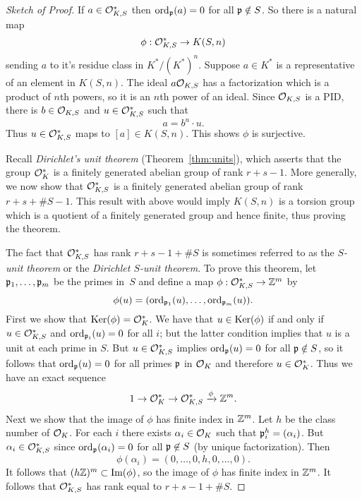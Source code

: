 \begin{proof}[Sketch of Proof]
	If $a \in \mathcal{O}_{K,S}^*$ then $\operatorname{ord}_{\mathfrak{p}}(a)=0$ for all $\mathfrak{p}\notin S$.
	So there is a natural map
	$$
		\phi: \mathcal{O}_{K,S}^* \to K(S,n)
	$$
	sending $a$ to it's residue class in $K^*/(K^*)^n$.
	Suppose $a\in K^*$ is a representative of an element in $K(S,n)$.
	The ideal $a \mathcal{O}_{K,S}$ has a factorization which is a product of $n$th
	powers, so it is an $n$th power of an ideal. Since $\mathcal{O}_{K,S}$ is a PID,
	there is $b\in \mathcal{O}_{K,S}$ and $u\in \mathcal{O}_{K,S}^*$ such that
	$$
		a = b^n \cdot u.
	$$
	Thus $u\in \mathcal{O}_{K,S}^*$ maps to $[a] \in K(S,n)$. This shows $\phi$
	is surjective.
	
	Recall {\em Dirichlet's unit theorem} (Theorem~\ref{thm:units}),
	which asserts that the group $\mathcal{O}_K^*$ is a finitely generated
	abelian group of rank $r+s-1$.  More generally, we
	now show that $\mathcal{O}_{K,S}^*$ is a finitely generated abelian group of
	rank $r+s+\#S -1$.
	This result with above would imply $K(S,n)$ is a torsion group
	which is a quotient of a finitely generated group and hence finite,
	thus proving the theorem.
	
	The fact that $\mathcal{O}_{K,S}^*$ has rank $r+s-1 + \#S$ is sometimes
	referred to as the \emph{$S$-unit theorem} or the
	\emph{Dirichlet $S$-unit theorem}. To prove this theorem,
	let $\mathfrak{p}_1,\ldots, \mathfrak{p}_m$ be the primes in~$S$
	and define a map $\phi: \mathcal{O}_{K,S}^* \to \mathbb{Z}^m$ by
	$$
		\phi(u) = (\operatorname{ord}_{\mathfrak{p}_1}(u), \ldots, \operatorname{ord}_{\mathfrak{p}_m}(u)).
	$$
	First we show that $\operatorname{Ker}(\phi) = \mathcal{O}_K^*$.  We have that
	$u\in \operatorname{Ker}(\phi)$ if and only if $u \in \mathcal{O}_{K,S}^*$
	and $\operatorname{ord}_{\mathfrak{p}_i}(u) = 0$ for all $i$; but the latter condition
	implies that $u$ is a unit at each prime in $S$. But
	$u\in \mathcal{O}_{K,S}^*$ implies $\operatorname{ord}_{\mathfrak{p}}(u) = 0$ for all $\mathfrak{p}\notin S$,
	so it follows that $\operatorname{ord}_{\mathfrak{p}}(u)=0$ for all primes $\mathfrak{p}$ in $\mathcal{O}_K$
	and therefore $u\in \mathcal{O}_K^*$.
	Thus we have an exact sequence
	$$
		1 \to \mathcal{O}_K^* \to \mathcal{O}_{K,S}^* \xrightarrow{\phi} \mathbb{Z}^m.
	$$
	Next we show that the image of $\phi$ has finite index
	in $\mathbb{Z}^m$.  Let $h$ be the class number of $\mathcal{O}_K$.
	For each $i$ there exists $\alpha_i \in \mathcal{O}_K$
	such that $\mathfrak{p}_i^h = (\alpha_i)$.  But $\alpha_i \in \mathcal{O}_{K,S}^*$
	since $\operatorname{ord}_{\mathfrak{p}}(\alpha_i) = 0$ for all $\mathfrak{p}\not\in S$ (by unique
	factorization). Then
	$$
		\phi(\alpha_i) = (0,\ldots, 0, h, 0,\ldots, 0).
	$$
	It follows that $(h\mathbb{Z})^m \subset \text{Im}(\phi)$, so
	the image of $\phi$ has finite index in $\mathbb{Z}^m$.  It follows
	that $\mathcal{O}_{K,S}^*$ has rank equal to $r+s-1+\#S$.
\end{proof}


